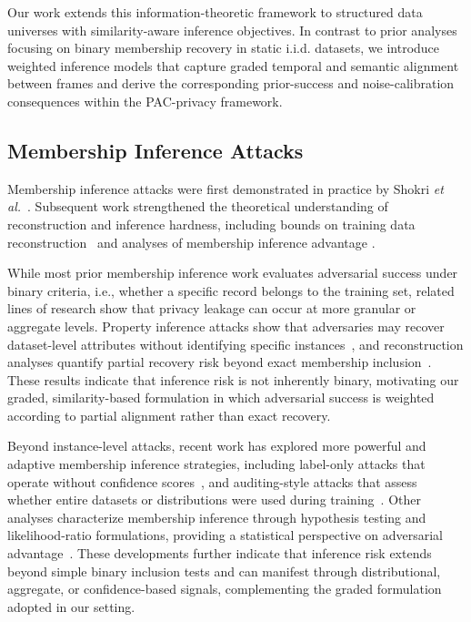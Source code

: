 \documentclass[letterpaper]{article} %
\begin{document}
Our work extends this information-theoretic framework to structured data universes with similarity-aware inference objectives. In contrast to prior analyses focusing on binary membership recovery in static i.i.d. datasets, we introduce weighted inference models that capture graded temporal and semantic alignment between frames and derive the corresponding prior-success and noise-calibration consequences within the PAC-privacy framework.

\subsection{Membership Inference Attacks}

Membership inference attacks were first demonstrated in practice by Shokri \textit{et al.}~\cite{shokri2017membership}. Subsequent work strengthened the theoretical understanding of reconstruction and inference hardness, including bounds on training data reconstruction~\cite{balle2022reconstructing,guo2022bounding} and analyses of membership inference advantage \cite{carlini2022firstprinciples,thudi2022bounding,hilprecht2019monte}.

While most prior membership inference work evaluates adversarial success under binary criteria, i.e., whether a specific record belongs to the training set, related lines of research show that privacy leakage can occur at more granular or aggregate levels. Property inference attacks show that adversaries may recover dataset-level attributes without identifying specific instances~\cite{ganju2018property,melis2019exploiting}, and reconstruction analyses quantify partial recovery risk beyond exact membership inclusion~\cite{balle2022reconstructing,guo2022bounding}. These results indicate that inference risk is not inherently binary, motivating our graded, similarity-based formulation in which adversarial success is weighted according to partial alignment rather than exact recovery.

Beyond instance-level attacks, recent work has explored more powerful and adaptive membership inference strategies, including label-only attacks that operate without confidence scores~\cite{choquette2021label}, and auditing-style attacks that assess whether entire datasets or distributions were used during training~\cite{sablayrolles2019white}. Other analyses characterize membership inference through hypothesis testing and likelihood-ratio formulations, providing a statistical perspective on adversarial advantage~\cite{yeom2018privacy}. These developments further indicate that inference risk extends beyond simple binary inclusion tests and can manifest through distributional, aggregate, or confidence-based signals, complementing the graded formulation adopted in our setting.
\end{document}
